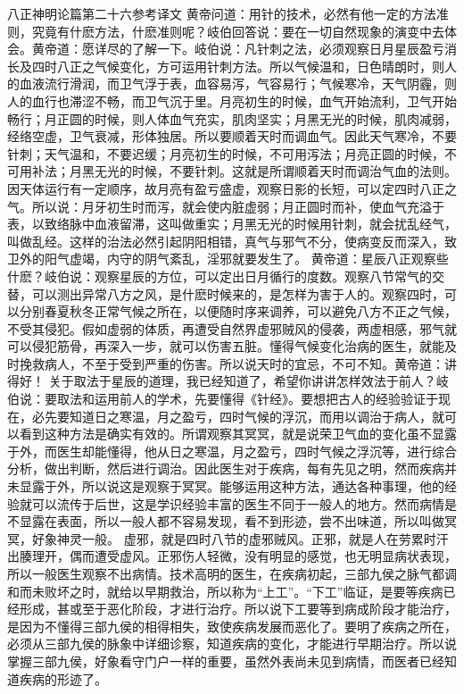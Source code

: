 \documentclass[a4paper,12pt,UTF8,twoside]{ctexbook}
\begin{document}
八正神明论篇第二十六参考译文
黄帝问道：用针的技术，必然有他一定的方法准则，究竟有什麽方法，什麽准则呢？岐伯回答说：要在一切自然现象的演变中去体会。黄帝道：愿详尽的了解一下。岐伯说：凡针刺之法，必须观察日月星辰盈亏消长及四时八正之气候变化，方可运用针刺方法。所以气候温和，日色晴朗时，则人的血液流行滑润，而卫气浮于表，血容易泻，气容易行；气候寒冷，天气阴霾，则人的血行也滞涩不畅，而卫气沉于里。月亮初生的时候，血气开始流利，卫气开始畅行；月正圆的时候，则人体血气充实，肌肉坚实；月黑无光的时候，肌肉减弱，经络空虚，卫气衰减，形体独居。所以要顺着天时而调血气。因此天气寒冷，不要针刺；天气温和，不要迟缓；月亮初生的时候，不可用泻法；月亮正圆的时候，不可用补法；月黑无光的时候，不要针刺。这就是所谓顺着天时而调治气血的法则。因天体运行有一定顺序，故月亮有盈亏盛虚，观察日影的长短，可以定四时八正之气。所以说：月牙初生时而泻，就会使内脏虚弱；月正圆时而补，使血气充溢于表，以致络脉中血液留滞，这叫做重实；月黑无光的时候用针刺，就会扰乱经气，叫做乱经。这样的治法必然引起阴阳相错，真气与邪气不分，使病变反而深入，致卫外的阳气虚竭，内守的阴气紊乱，淫邪就要发生了。
黄帝道：星辰八正观察些什麽？岐伯说：观察星辰的方位，可以定出日月循行的度数。观察八节常气的交替，可以测出异常八方之风，是什麽时候来的，是怎样为害于人的。观察四时，可以分别春夏秋冬正常气候之所在，以便随时序来调养，可以避免八方不正之气候，不受其侵犯。假如虚弱的体质，再遭受自然界虚邪贼风的侵袭，两虚相感，邪气就可以侵犯筋骨，再深入一步，就可以伤害五脏。懂得气候变化治病的医生，就能及时挽救病人，不至于受到严重的伤害。所以说天时的宜忌，不可不知。黄帝道：讲得好！
关于取法于星辰的道理，我已经知道了，希望你讲讲怎样效法于前人？岐伯说：要取法和运用前人的学术，先要懂得《针经》。要想把古人的经验验证于现在，必先要知道日之寒温，月之盈亏，四时气候的浮沉，而用以调治于病人，就可以看到这种方法是确实有效的。所谓观察其冥冥，就是说荣卫气血的变化虽不显露于外，而医生却能懂得，他从日之寒温，月之盈亏，四时气候之浮沉等，进行综合分析，做出判断，然后进行调治。因此医生对于疾病，每有先见之明，然而疾病并未显露于外，所以说这是观察于冥冥。能够运用这种方法，通达各种事理，他的经验就可以流传于后世，这是学识经验丰富的医生不同于一般人的地方。然而病情是不显露在表面，所以一般人都不容易发现，看不到形迹，尝不出味道，所以叫做冥冥，好象神灵一般。
虚邪，就是四时八节的虚邪贼风。正邪，就是人在劳累时汗出腠理开，偶而遭受虚风。正邪伤人轻微，没有明显的感觉，也无明显病状表现，所以一般医生观察不出病情。技术高明的医生，在疾病初起，三部九侯之脉气都调和而未败坏之时，就给以早期救治，所以称为“上工”。“下工”临证，是要等疾病已经形成，甚或至于恶化阶段，才进行治疗。所以说下工要等到病成阶段才能治疗，是因为不懂得三部九侯的相得相失，致使疾病发展而恶化了。要明了疾病之所在，必须从三部九侯的脉象中详细诊察，知道疾病的变化，才能进行早期治疗。所以说掌握三部九侯，好象看守门户一样的重要，虽然外表尚未见到病情，而医者已经知道疾病的形迹了。
\end{document}
